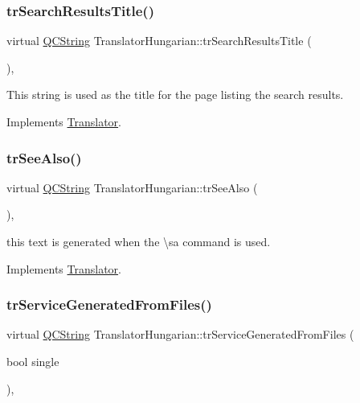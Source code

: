 \subsubsection{\texorpdfstring{trSearchResultsTitle()}{trSearchResultsTitle()}}
{\footnotesize\ttfamily virtual \mbox{\hyperlink{class_q_c_string}{Q\+C\+String}} Translator\+Hungarian\+::tr\+Search\+Results\+Title (\begin{DoxyParamCaption}{ }\end{DoxyParamCaption})\hspace{0.3cm}{\ttfamily [inline]}, {\ttfamily [virtual]}}

This string is used as the title for the page listing the search results. 

Implements \mbox{\hyperlink{class_translator}{Translator}}.

\mbox{\label{class_translator_hungarian_ab897f1b82ffd10cae46cb4b35fa166ea}} 
\subsubsection{\texorpdfstring{trSeeAlso()}{trSeeAlso()}}
{\footnotesize\ttfamily virtual \mbox{\hyperlink{class_q_c_string}{Q\+C\+String}} Translator\+Hungarian\+::tr\+See\+Also (\begin{DoxyParamCaption}{ }\end{DoxyParamCaption})\hspace{0.3cm}{\ttfamily [inline]}, {\ttfamily [virtual]}}

this text is generated when the \textbackslash{}sa command is used. 

Implements \mbox{\hyperlink{class_translator}{Translator}}.

\mbox{\label{class_translator_hungarian_a3f491ed6719982e1e8682c23097d1527}} 
\subsubsection{\texorpdfstring{trServiceGeneratedFromFiles()}{trServiceGeneratedFromFiles()}}
{\footnotesize\ttfamily virtual \mbox{\hyperlink{class_q_c_string}{Q\+C\+String}} Translator\+Hungarian\+::tr\+Service\+Generated\+From\+Files (\begin{DoxyParamCaption}\item[{bool}]{single }\end{DoxyParamCaption})\hspace{0.3cm}{\ttfamily [inline]}, {\ttfamily [virtual]}}

